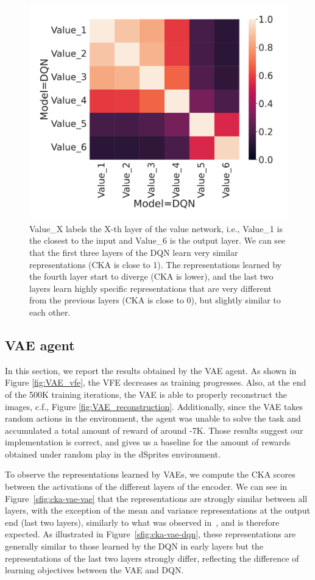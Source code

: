 \documentclass[twoside,11pt]{article}
\begin{document}
\begin{figure}[H]
    \centering
    \includegraphics[width=0.5\linewidth]{cka_figures/CKA_dqn_1_dqn_1}
    \caption{Value\_X labels the X-th layer of the value network, i.e., Value\_1 is the closest to the input and Value\_6 is the output layer. We can see that the first three layers of the DQN learn very similar representations (CKA is close to 1). The representations learned by the fourth layer start to diverge (CKA is lower), and the last two layers learn highly specific representations that are very different from the previous layers (CKA is close to 0), but slightly similar to each other.}\label{fig:cka-dqn}
\end{figure}

\subsection{VAE agent} \label{ssec:vae_results}

In this section, we report the results obtained by the VAE agent. As shown in Figure \ref{fig:VAE_vfe}, the VFE decreases as training progresses. Also, at the end of the 500K training iterations, the VAE is able to properly reconstruct the  images, c.f., Figure \ref{fig:VAE_reconstruction}. Additionally, since the VAE takes random actions in the environment, the agent was unable to solve the task and accumulated a total amount of reward of around -7K. Those results suggest our implementation is correct, and gives us a baseline for the amount of rewards obtained under random play in the dSprites environment.

To observe the representations learned by VAEs, we compute the CKA scores between the activations of the different layers of the encoder. We can see in Figure~\ref{sfig:cka-vae-vae} that the representations are strongly similar between all layers, with the exception of the mean and variance representations at the output end (last two layers), similarly to what was observed in~\citet{Bonheme2022}, and is therefore expected. As illustrated in Figure~\ref{sfig:cka-vae-dqn}, these representations are generally similar to those learned by the DQN in early layers but the representations of the last two layers strongly differ, reflecting the difference of learning objectives between the VAE and DQN.
\end{document}
